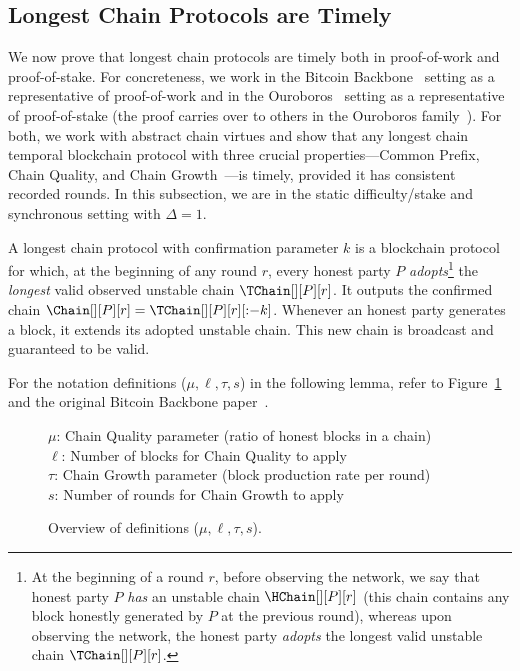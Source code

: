 \subsection{Longest Chain Protocols are Timely}

We now prove that longest chain protocols are timely both in proof-of-work and proof-of-stake.
For concreteness, we work in the Bitcoin Backbone~\cite{backbone} setting
as a representative of proof-of-work and in the Ouroboros~\cite{ouroboros} setting
as a representative of proof-of-stake (the proof carries over to others in the Ouroboros family~\cite{praos,ouroboros-genesis}).
For both, we work with abstract chain virtues
and show that any longest chain
temporal blockchain protocol with three crucial properties---Common Prefix,
Chain Quality, and Chain Growth~\cite{backbone}---is timely,
provided it has consistent recorded rounds.
In this subsection, we are in the
static difficulty/stake and synchronous setting with $\Delta = 1$.

\begin{definition}
  A longest chain protocol with confirmation parameter $k$
  is a blockchain protocol for which,
  at the beginning of any round $r$, every honest party $P$ \emph{adopts}\footnote{
    At the beginning of a round $r$, before observing the network, we say that
    honest party $P$ \emph{has} an unstable chain $\HChain[][P][r]$ (this chain
    contains any block honestly generated by $P$ at the previous round), whereas
    upon observing the network, the honest party \emph{adopts} the longest
    valid unstable chain $\TChain[][P][r]$.
  }
  the \emph{longest} valid observed unstable chain $\TChain[][P][r]$. It outputs the
  confirmed chain $\Chain[][P][r] = \TChain[][P][r][{:}{-k}]$.
  Whenever an honest party generates a block, it extends
  its adopted unstable chain. This new chain is broadcast and
  guaranteed to be valid.
\end{definition}

For the notation definitions ($\mu, \ell, \tau, s$)
in the following lemma, refer to Figure~\ref{fig.backbone-variables}
and the original Bitcoin Backbone paper~\cite{backbone-new}.

\begin{figure}
  \begin{mdframed}
    $\mu$: Chain Quality parameter (ratio of honest blocks in a chain)\\
    $\ell$: Number of blocks for Chain Quality to apply\\
    $\tau$: Chain Growth parameter (block production rate per round)\\
    $s$: Number of rounds for Chain Growth to apply
  \end{mdframed}
  \caption{Overview of definitions ($\mu, \ell, \tau, s$).}
  \label{fig.backbone-variables}
\end{figure}

